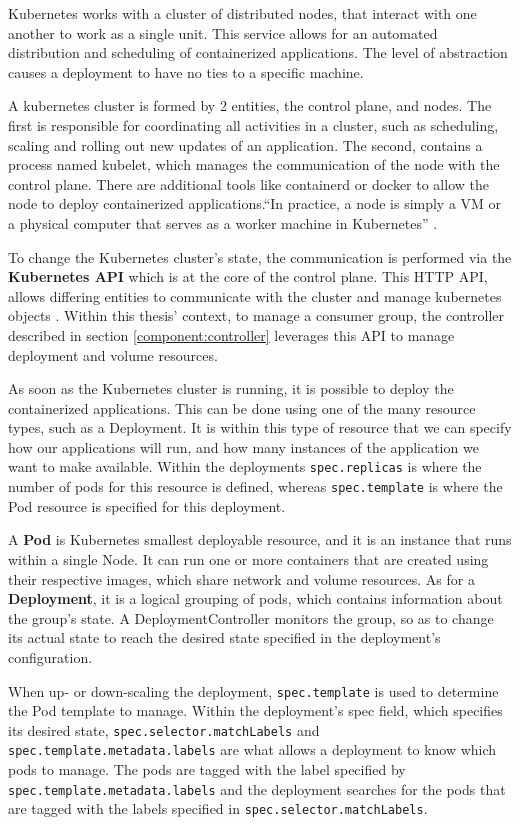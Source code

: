 Kubernetes works with a cluster of distributed nodes, that interact with one
another to work as a single unit. This service allows for an automated
distribution and scheduling of containerized applications. The level of
abstraction causes a deployment to have no ties to a specific machine.

A kubernetes cluster is formed by 2 entities, the control plane, and nodes. The
first is responsible for coordinating all activities in a cluster, such as
scheduling, scaling and rolling out new updates of an application. The second,
contains a process named kubelet, which manages the communication of the node
with the control plane. There are additional tools like containerd or docker to
allow the node to deploy containerized applications.``In practice, a node is
simply a VM or a physical computer that serves as a worker machine in
Kubernetes'' \cite{CreateKubeCluster}.

To change the Kubernetes cluster's state, the communication is performed via the
\textbf{Kubernetes API} which is at the core of the control plane. This HTTP
API, allows differing entities to communicate with the cluster and manage
kubernetes objects \cite{KubernetesAPI}. Within this thesis' context, to manage
a consumer group, the controller described in section \ref{component:controller}
leverages this API to manage deployment and volume resources.

As soon as the Kubernetes cluster is running, it is possible to deploy the
containerized applications. This can be done using one of the many resource
types, such as a Deployment. It is within this type of resource that we can
specify how our applications will run, and how many instances of the application
we want to make available. Within the deployments \lstinline{spec.replicas} is
where the number of pods for this resource is defined, whereas
\lstinline{spec.template} is where the Pod resource is specified for this
deployment. 

A \textbf{Pod} is Kubernetes smallest deployable resource, and it is
an instance that runs within a single Node. It can run one or more containers
that are created using their respective images, which share network and volume
resources. As for a \textbf{Deployment}, it is a logical grouping of pods, which
contains information about the group's state. A DeploymentController monitors
the group, so as to change its actual state to reach the desired state specified
in the deployment's configuration.

When up- or down-scaling the deployment, \lstinline{spec.template} is used to
determine the Pod template to manage. Within the deployment's spec field, which
specifies its desired state, \lstinline{spec.selector.matchLabels} and
\lstinline{spec.template.metadata.labels} are what allows a deployment to know
which pods to manage. The pods are tagged with the label specified by
\lstinline{spec.template.metadata.labels} and the deployment searches for the
pods that are tagged with the labels specified in
\lstinline{spec.selector.matchLabels}.

